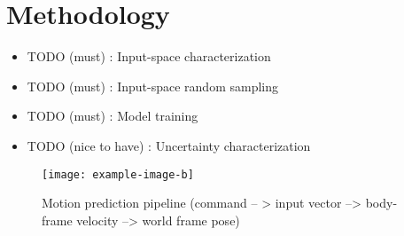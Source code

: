 \section{Methodology}

\begin{itemize}
	\item TODO (must) : Input-space characterization
	\item TODO (must) : Input-space random sampling
	\item TODO (must) : Model training
	\item TODO (nice to have) : Uncertainty characterization
\end{itemize}

\lightlipsum[1-4]

\begin{figure}[htbp]
	\centering
	\texttt{[image: example-image-b]}
	\caption{Motion prediction pipeline (command -- > input vector --> body-frame velocity --> world frame pose)}
	\label{fig:b}
\end{figure}

\lightlipsum[1-12]